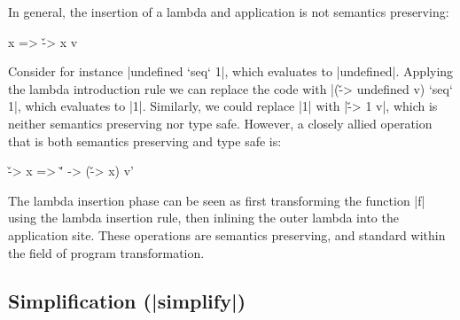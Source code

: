 \documentclass[preprint]{sigplanconf}
\begin{document}
In general, the insertion of a lambda and application is not semantics preserving:

\begin{code}
x => \v -> x v
\end{code}

Consider for instance |undefined `seq` 1|, which evaluates to |undefined|. Applying the lambda introduction rule we can replace the code with |(\v -> undefined v) `seq` 1|, which evaluates to |1|. Similarly, we could replace |1| with |\v -> 1 v|, which is neither semantics preserving nor type safe. However, a closely allied operation that is both semantics preserving and type safe is:

\begin{code}
\v -> x => \v' -> (\v -> x) v'
\end{code}

The lambda insertion phase can be seen as first transforming the function |f| using the lambda insertion rule, then inlining the outer lambda into the application site. These operations are semantics preserving, and standard within the field of program transformation.

\subsection{Simplification (|simplify|)}

\newcommand{\simp}[2]{\vspace{-7mm} #2 & (#1) \\}
\newenvironment{simplify}
    {\begin{flushright}
     \begin{tabular}{p{6.5cm}r}
    }
    {\end{tabular}
     \vspace{-7mm}
     \end{flushright}
    }
\end{document}
